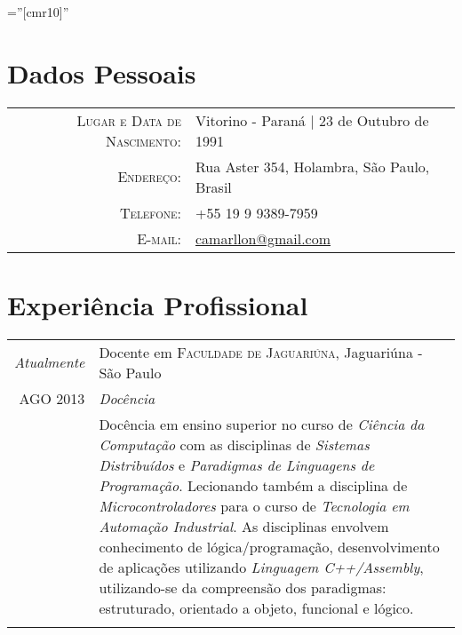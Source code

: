 \documentclass[a4paper,10pt]{article} %
\begin{document}
\pagestyle{empty} %

\font\fb=''[cmr10]'' %

\begin{samepage}
\par{\bigskip\par} %

\section{Dados Pessoais}

\begin{tabular}{rl}
\textsc{Lugar e Data de Nascimento:} & Vitorino - Paraná | 23 de Outubro de 1991 \\
\textsc{Endereço:} & Rua Aster 354, Holambra, São Paulo, Brasil\\
\textsc{Telefone:} & +55 19 9 9389-7959\\
\textsc{E-mail:} & \href{mailto:camarllon@gmail.com}{camarllon@gmail.com}
\end{tabular}


\section{Experiência Profissional}

\begin{tabular}{r|p{11cm}}

\emph{Atualmente} & Docente em \textsc{Faculdade de Jaguariúna}, Jaguariúna - São Paulo \emph{} \\
  \textsc{AGO 2013} & \emph{Docência}\\ 
                    & \footnotesize{Docência em ensino superior no curso de \textit{Ciência da Computação} com as disciplinas de \textit{Sistemas Distribuídos} e \textit{Paradigmas de Linguagens de Programação}. Lecionando também a disciplina de \textit{Microcontroladores} para o curso de \textit{Tecnologia em Automação Industrial}. As disciplinas envolvem conhecimento de lógica/programação, desenvolvimento de aplicações utilizando \emph{Linguagem C++/Assembly}, utilizando-se da compreensão dos paradigmas: estruturado, orientado a objeto, funcional e lógico.}\\
\multicolumn{2}{c}{} \\


\end{tabular}
\end{samepage}
\end{document}
